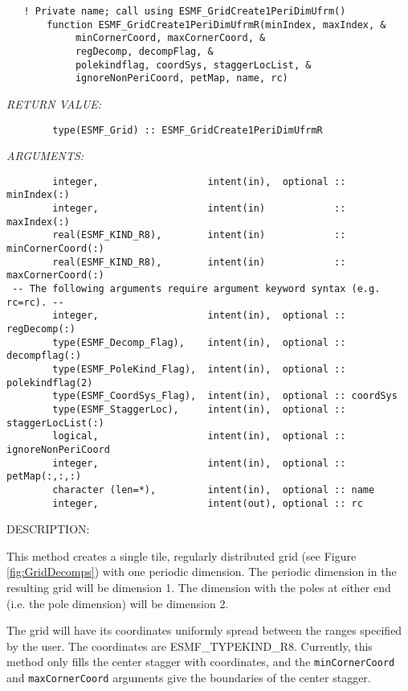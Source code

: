  
\begin{verbatim}   ! Private name; call using ESMF_GridCreate1PeriDimUfrm()
       function ESMF_GridCreate1PeriDimUfrmR(minIndex, maxIndex, &
            minCornerCoord, maxCornerCoord, &
            regDecomp, decompFlag, &
            polekindflag, coordSys, staggerLocList, &
            ignoreNonPeriCoord, petMap, name, rc)
 \end{verbatim}{\em RETURN VALUE:}
\begin{verbatim}        type(ESMF_Grid) :: ESMF_GridCreate1PeriDimUfrmR\end{verbatim}{\em ARGUMENTS:}
\begin{verbatim}        integer,                   intent(in),  optional :: minIndex(:)
        integer,                   intent(in)            :: maxIndex(:)
        real(ESMF_KIND_R8),        intent(in)            :: minCornerCoord(:)
        real(ESMF_KIND_R8),        intent(in)            :: maxCornerCoord(:)
 -- The following arguments require argument keyword syntax (e.g. rc=rc). --
        integer,                   intent(in),  optional :: regDecomp(:)
        type(ESMF_Decomp_Flag),    intent(in),  optional :: decompflag(:)
        type(ESMF_PoleKind_Flag),  intent(in),  optional :: polekindflag(2)
        type(ESMF_CoordSys_Flag),  intent(in),  optional :: coordSys
        type(ESMF_StaggerLoc),     intent(in),  optional :: staggerLocList(:)
        logical,                   intent(in),  optional :: ignoreNonPeriCoord
        integer,                   intent(in),  optional :: petMap(:,:,:)
        character (len=*),         intent(in),  optional :: name
        integer,                   intent(out), optional :: rc\end{verbatim}
{\sf DESCRIPTION:\\ }


  
   This method creates a single tile, regularly distributed grid
   (see Figure \ref{fig:GridDecomps}) with one periodic dimension.
   The periodic dimension in the resulting grid will be dimension 1.
   The dimension with the poles at either end (i.e. the pole dimension)
   will be dimension 2.
  
   The grid will have its coordinates uniformly spread between the
   ranges specified by the user. The coordinates are ESMF\_TYPEKIND\_R8.
   Currently, this method only fills the center stagger with coordinates, and
   the {\tt minCornerCoord} and {\tt maxCornerCoord} arguments give the boundaries of
   the center stagger.
  
